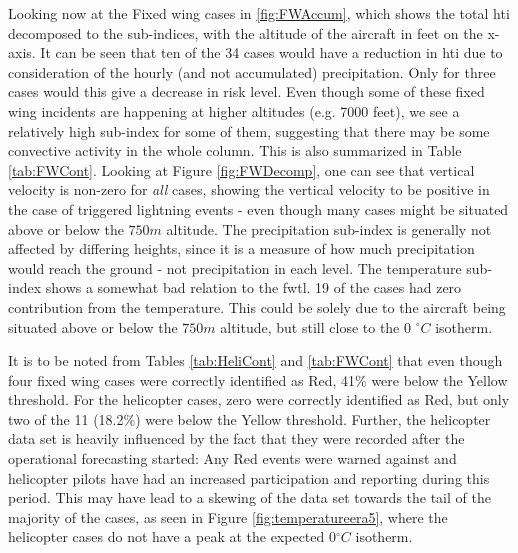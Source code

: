 Looking now at the Fixed wing cases in \ref{fig:FWAccum}, which shows the total \acrshort{hti} decomposed to the sub-indices, with the altitude of the aircraft in feet on the x-axis. It can be seen that ten of the 34 cases would have a reduction in \acrshort{hti} due to consideration of the hourly (and not accumulated) precipitation. Only for three cases would this give a decrease in risk level. Even though some of these fixed wing incidents are happening at higher altitudes (e.g. 7000 feet), we see a relatively high sub-index for some of them, suggesting that there may be some convective activity in the whole column. This is also summarized in Table \ref{tab:FWCont}. Looking at Figure \ref{fig:FWDecomp}, one can see that vertical velocity is non-zero for \textit{all} cases, showing the vertical velocity to be positive in the case of triggered lightning events - even though many cases might be situated above or below the $750m$ altitude. The precipitation sub-index is generally not affected by differing heights, since it is a measure of how much precipitation would reach the ground - not precipitation in each level. The temperature sub-index shows a somewhat bad relation to the \acrshort{fwtl}. 19 of the cases had zero contribution from the temperature. This could be solely due to the aircraft being situated above or below the $750m$ altitude, but still close to the 0 $^{\circ}C$ isotherm.

It is to be noted from Tables \ref{tab:HeliCont} and \ref{tab:FWCont} that even though four fixed wing cases were correctly identified as Red, 41$\%$ were below the Yellow threshold. For the helicopter cases, zero were correctly identified as Red, but only two of the 11 (18.2$\%$) were below the Yellow threshold. Further, the helicopter data set is heavily influenced by the fact that they were recorded after the operational forecasting started: Any Red events were warned against and helicopter pilots have had an increased participation and reporting during this period. This may have lead to a skewing of the data set towards the tail of the majority of the cases, as seen in Figure \ref{fig:temperatureera5}, where the helicopter cases do not have a peak at the expected 0$^{\circ}C$ isotherm.

